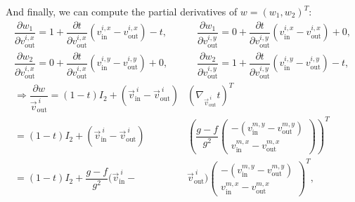 \begin{proposition}
	And finally, we can compute the partial derivatives of $w = (w_1, w_2)^T$:
	\begin{align*}
		\dfrac{\partial w_1}{\partial v_{\text{out}}^{i, x}} = 1 + \dfrac{\partial t}{\partial v_{\text{out}}^{i, x}}(v_{\text{in}}^{i, x}- v_{\text{out}}^{i, x}) - t, &\quad 
		\dfrac{\partial w_1}{\partial v_{\text{out}}^{i, y}} = 0 + \dfrac{\partial t}{\partial v_{\text{out}}^{i, y}}(v_{\text{in}}^{i, x}- v_{\text{out}}^{i, x}) + 0, \\[0.5em]
		\dfrac{\partial w_2}{\partial v_{\text{out}}^{i, x}} = 0 + \dfrac{\partial t}{\partial v_{\text{out}}^{i, x}}(v_{\text{in}}^{i, y}- v_{\text{out}}^{i, y}) + 0, &\quad 
		\dfrac{\partial w_2}{\partial v_{\text{out}}^{i, y}} = 1 + \dfrac{\partial t}{\partial v_{\text{out}}^{i, y}}(v_{\text{in}}^{i, y}- v_{\text{out}}^{i, y}) - t, \\[0.5em]
		\Rightarrow \dfrac{\partial w}{\vec{v}_{\text{out}}^{\: i}} = (1-t)I_2 + (\vec{v}_{\text{in}}^{\: i} - \vec{v}_{\text{out}}^{\: i}) &(\nabla_{\vec{v}_{\text{out}}^{\: i}} t)^T \\[0.5em]
		= (1-t)I_2 + (\vec{v}_{\text{in}}^{\: i} - \vec{v}_{\text{out}}^{\: i}) &\left(\dfrac{g - f}{g^2} \begin{pmatrix}
			-(v_{\text{in}}^{m, y} - v_{\text{out}}^{m, y}) \\[0.5em]
			 v_{\text{in}}^{m, x} - v_{\text{out}}^{m, x}
		\end{pmatrix}\right)^T \\[0.5em]
		= (1-t)I_2 + \dfrac{g - f}{g^2}(\vec{v}_{\text{in}}^{\: i} - &\vec{v}_{\text{out}}^{\: i}) \begin{pmatrix}
			-(v_{\text{in}}^{m, y} - v_{\text{out}}^{m, y}) \\[0.5em]
			 v_{\text{in}}^{m, x} - v_{\text{out}}^{m, x}
		\end{pmatrix}^T, \\[0.5em]
	\end{align*}
	

\end{proposition}
